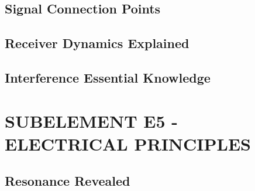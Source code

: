 \documentclass[12pt]{book}
\begin{document}
\section{Signal Connection Points}














\section{Receiver Dynamics Explained}














\section{Interference Essential Knowledge}














\chapter{SUBELEMENT E5 - ELECTRICAL PRINCIPLES}
\section{Resonance Revealed}













\end{document}
